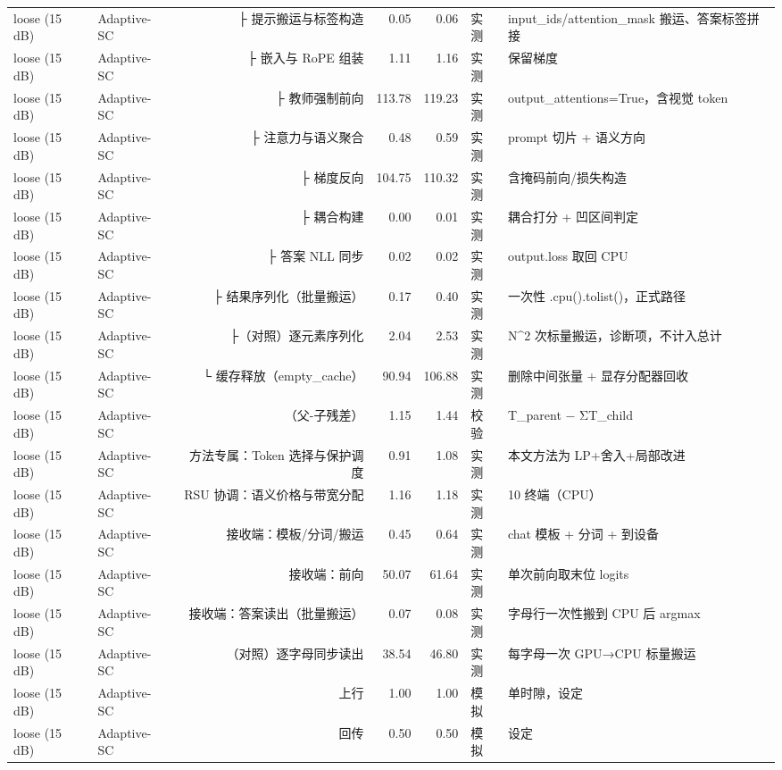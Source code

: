 \begin{tabular}{llrrrl}
loose (15 dB) & Adaptive-SC & ├ 提示搬运与标签构造 & 0.05 & 0.06 & 实测 & input_ids/attention_mask 搬运、答案标签拼接\\
loose (15 dB) & Adaptive-SC & ├ 嵌入与 RoPE 组装 & 1.11 & 1.16 & 实测 & 保留梯度\\
loose (15 dB) & Adaptive-SC & ├ 教师强制前向 & 113.78 & 119.23 & 实测 & output_attentions=True，含视觉 token\\
loose (15 dB) & Adaptive-SC & ├ 注意力与语义聚合 & 0.48 & 0.59 & 实测 & prompt 切片 + 语义方向\\
loose (15 dB) & Adaptive-SC & ├ 梯度反向 & 104.75 & 110.32 & 实测 & 含掩码前向/损失构造\\
loose (15 dB) & Adaptive-SC & ├ 耦合构建 & 0.00 & 0.01 & 实测 & 耦合打分 + 凹区间判定\\
loose (15 dB) & Adaptive-SC & ├ 答案 NLL 同步 & 0.02 & 0.02 & 实测 & output.loss 取回 CPU\\
loose (15 dB) & Adaptive-SC & ├ 结果序列化（批量搬运） & 0.17 & 0.40 & 实测 & 一次性 .cpu().tolist()，正式路径\\
loose (15 dB) & Adaptive-SC & ├（对照）逐元素序列化 & 2.04 & 2.53 & 实测 & N^2 次标量搬运，诊断项，不计入总计\\
loose (15 dB) & Adaptive-SC & └ 缓存释放（empty_cache） & 90.94 & 106.88 & 实测 & 删除中间张量 + 显存分配器回收\\
loose (15 dB) & Adaptive-SC & （父-子残差） & 1.15 & 1.44 & 校验 & T_parent − ΣT_child\\
loose (15 dB) & Adaptive-SC & 方法专属：Token 选择与保护调度 & 0.91 & 1.08 & 实测 & 本文方法为 LP+舍入+局部改进\\
loose (15 dB) & Adaptive-SC & RSU 协调：语义价格与带宽分配 & 1.16 & 1.18 & 实测 & 10 终端（CPU）\\
loose (15 dB) & Adaptive-SC & 接收端：模板/分词/搬运 & 0.45 & 0.64 & 实测 & chat 模板 + 分词 + 到设备\\
loose (15 dB) & Adaptive-SC & 接收端：前向 & 50.07 & 61.64 & 实测 & 单次前向取末位 logits\\
loose (15 dB) & Adaptive-SC & 接收端：答案读出（批量搬运） & 0.07 & 0.08 & 实测 & 字母行一次性搬到 CPU 后 argmax\\
loose (15 dB) & Adaptive-SC & （对照）逐字母同步读出 & 38.54 & 46.80 & 实测 & 每字母一次 GPU→CPU 标量搬运\\
loose (15 dB) & Adaptive-SC & 上行 & 1.00 & 1.00 & 模拟 & 单时隙，设定\\
loose (15 dB) & Adaptive-SC & 回传 & 0.50 & 0.50 & 模拟 & 设定\\

\end{tabular}
